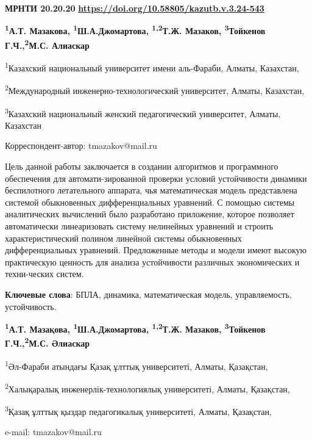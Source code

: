 \newpage
{\bfseries МРНТИ 20.20.20}
\hfill {\bfseries \href{https://doi.org/10.58805/kazutb.v.3.24-543}{https://doi.org/10.58805/kazutb.v.3.24-543}}


\begin{center}
{\bfseries \textsuperscript{1}А.Т. Мазакова,
\textsuperscript{1}Ш.А.Джомартова, \textsuperscript{1,2}Т.Ж.
Мазаков\envelope, \textsuperscript{3}Тойкенов Г.Ч.,\textsuperscript{2}М.С. Алиаскар}

\textsuperscript{1}Казахский национальный университет имени аль-Фараби,
Алматы, Казахстан,

\textsuperscript{2}Международный инженерно-технологический университет,
Алматы, Казахстан,

\textsuperscript{3}Казахский национальный женский педагогический
университет, Алматы, Казахстан
\end{center}
\envelope Корреспондент-автор: tmazakov@mail.ru \vspace{0.5cm}

Цель данной работы заключается в создании алгоритмов и программного
обеспечения для автомати-зированной проверки условий устойчивости
динамики беспилотного летательного аппарата, чья математическая модель
представлена системой обыкновенных дифференциальных уравнений. С помощью
системы аналитических вычислений было разработано приложение, которое
позволяет автоматически линеаризовать систему нелинейных уравнений и
строить характеристический полином линейной системы обыкновенных
дифференциальных уравнений. Предложенные методы и модели имеют высокую
практическую ценность для анализа устойчивости различных экономических и
техни-ческих систем.

{\bfseries Ключевые слова}: БПЛА, динамика, математическая модель,
управляемость, устойчивость.


\begin{center}
{\bfseries \textsuperscript{1}А.Т. Мазақова,
\textsuperscript{1}Ш.А.Джомартова, \textsuperscript{1,2}Т.Ж.
Мазаков\envelope, \textsuperscript{3}Тойкенов Г.Ч.,\textsuperscript{2}М.С. Әлиаскар}

\textsuperscript{1}Әл-Фараби атындағы Қазақ ұлттық университеті, Алматы,
Қазақстан,

\textsuperscript{2}Халықаралық инженерлік-технологиялық университеті,
Алматы, Қазақстан,

\textsuperscript{3}Қазақ ұлттық қыздар педагогикалық университеті,
Алматы, Қазақстан,

e-mail: tmazakov@mail.ru
\end{center}

